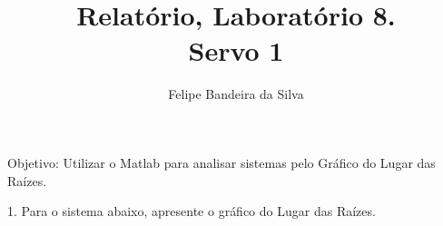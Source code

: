 \documentclass[a4paper, 10pt]{article}
\title{Relatório, Laboratório 8.\\Servo 1}
\author{Felipe Bandeira da Silva}
\date{}
\begin{document}
\maketitle

Objetivo: Utilizar o Matlab para analisar sistemas pelo Gráfico do Lugar das Raízes.
\newpage

\listoffigures

\newpage

1. Para o sistema abaixo, apresente o gráfico do Lugar das Raízes.
\end{document}
